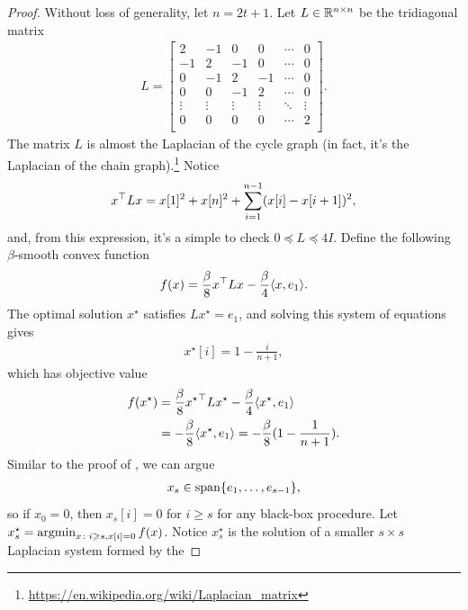 \begin{proof}
Without loss of generality, let $n = 2t+1$.
Let $L \in \mathbb{R}^{n \times n}$ be the tridiagonal matrix
\begin{align*}
    L =
    \begin{bmatrix}
        2 & -1 & 0 & 0 & \cdots & 0 \\
        -1 & 2 & -1 & 0 & \cdots & 0 \\
        0 & -1 & 2 & -1  & \cdots & 0 \\
        0 & 0 & -1 & 2  & \cdots & 0 \\
        \vdots & \vdots & \vdots & \vdots & \ddots & \vdots \\
        0 & 0 & 0 & 0 & \cdots & 2  \\
    \end{bmatrix}.
\end{align*}
The matrix $L$ is almost the Laplacian of the cycle
graph (in fact, it's the Laplacian of the chain graph).\footnote{\url{https://en.wikipedia.org/wiki/Laplacian_matrix}}
Notice
\begin{align*}
    x^\top L x = x[1]^2 + x[n]^2 + \sum_{i=1}^{n-1} (x[i] - x[i+1])^2,
\end{align*}
and, from this expression, it's a simple to check
$0 \preceq L \preceq 4I$.
Define the following $\beta$-smooth convex function
\begin{align*}
    f(x) = \frac{\beta}{8} x^\top L x - \frac{\beta}{4}\langle x, e_1 \rangle.
\end{align*}
The optimal solution $x^\star$ satisfies $Lx^\star = e_1$, and solving this 
system of equations gives
\begin{align*}
    x^\star[i] = 1 - \frac{i}{n+1},
\end{align*}
which has objective value
\begin{align*}
    f(x^\star)
    &=  \frac{\beta}{8} {x^\star}^\top L x^\star - \frac{\beta}{4}\langle
    x^\star, e_1 \rangle \\
    &= -\frac{\beta}{8} \langle x^\star, e_1 \rangle
    = -\frac{\beta}{8} (1 - \frac{1}{n+1} ).
\end{align*}
Similar to the proof of , we can argue
\begin{align*}
    x_s \in \mathop{\rm span}\{e_1, \dots, e_{s-1}\},
\end{align*}
so if $x_0 = 0$, then $x_s[i] = 0$ for $i \geq s$ for any black-box procedure.
Let $x_s^\star = \mathop{\rm argmin}_{x \colon i\geqslant s, x[i] = 0} f(x)$. Notice $x_s^\star$
is the solution of a smaller $s \times s$ Laplacian system formed by the

\end{proof}
